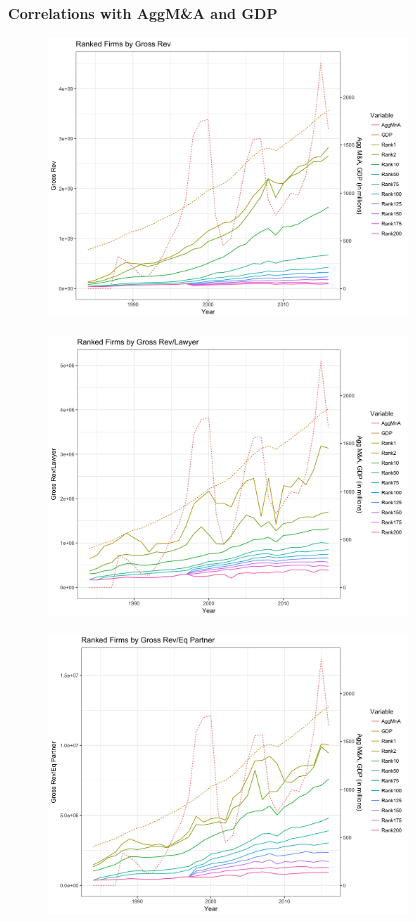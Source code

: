 \documentclass{article}
\begin{document}
\newpage

{\large \textbf{Correlations with AggM\&A and GDP} }

\begin{figure}[H]\centering
\includegraphics[width=0.85\textwidth]{../IndivTexOutput/MnAGDP-1.jpg}\end{figure}

\begin{figure}[H]\centering
\includegraphics[width=0.85\textwidth]{../IndivTexOutput/MnAGDP-2.jpg}\end{figure}

\begin{figure}[H]\centering
\includegraphics[width=0.85\textwidth]{../IndivTexOutput/MnAGDP-3.jpg}\end{figure}
\end{document}
